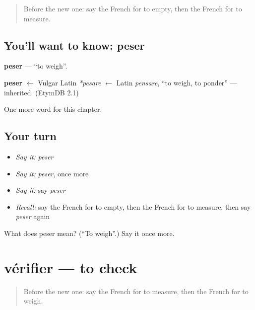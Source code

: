 \label{lesson:FR-C234-peser}



\begin{quote}
Before the new one: say the French for to empty, then the French for to measure.
\end{quote}

\subsection*{You'll want to know: peser}
\textbf{peser} — \textquotedblleft{}to weigh\textquotedblright{}.

\begin{cousinweb}
\textbf{peser} $\leftarrow$ Vulgar Latin \emph{*pesare} $\leftarrow$ Latin \emph{pensare}, \textquotedblleft{}to weigh, to ponder\textquotedblright{} — inherited. (EtymDB 2.1)
\end{cousinweb}

\begin{grammarlens}[title={What you've built}]
One more word for this chapter.
\end{grammarlens}

\subsection*{Your turn}
\begin{itemize}
\raggedright
  \item \emph{Say it:} \emph{peser}
  \item \emph{Say it:} \emph{peser}, once more
  \item \emph{Say it:} say \emph{peser}
  \item \emph{Recall:} say the French for to empty, then the French for to measure, then say \emph{peser} again
\end{itemize}

\begin{tcolorbox}[breakable,colback=teal!4,colframe=teal!35!black,title={Before you move on}]
What does peser mean? (\textquotedblleft{}To weigh\textquotedblright{}.) Say it once more.
\end{tcolorbox}
\section[vérifier]{vérifier — to check}

\label{lesson:FR-C234-verifier}



\begin{quote}
Before the new one: say the French for to measure, then the French for to weigh.
\end{quote}

